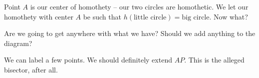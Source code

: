 





Point $A$ is our center of homothety -- our two circles are homothetic. We let our homothety with center $A$ be such that $h(\text{little circle}) = \text{big circle}$. Now what?

Are we going to get anywhere with what we have?  Should we add anything to the diagram?







We can label a few points. We should definitely extend $AP$. This is the alleged bisector, after all.




